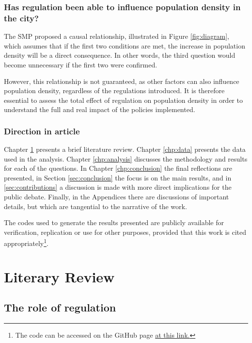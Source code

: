 \subsection*{Has regulation been able to influence population density in the city?}

The SMP proposed a causal relationship, illustrated in Figure \ref{fig:diagram}, which assumes that if the first two conditions are met, the increase in population density will be a direct consequence. In other words, the third question would become unnecessary if the first two were confirmed.

However, this relationship is not guaranteed, as other factors can also influence population density, regardless of the regulations introduced. It is therefore essential to assess the total effect of regulation on population density in order to understand the full and real impact of the policies implemented.

\subsection*{Direction in article}

Chapter \ref{chp:review} presents a brief literature review. Chapter \ref{chp:data} presents the data used in the analysis. Chapter \ref{chp:analysis} discusses the methodology and results for each of the questions. In Chapter \ref{chp:conclusion} the final reflections are presented, in Section \ref{sec:conclusion} the focus is on the main results, and in \ref{sec:contributions} a discussion is made with more direct implications for the public debate. Finally, in the Appendices there are discussions of important details, but which are tangential to the narrative of the work.

The codes used to generate the results presented are publicly available for verification, replication or use for other purposes, provided that this work is cited appropriately\footnote{The code can be accessed on the GitHub page \href{https://github.com/gustavo-tm}{at this link.}}.


\chapter{Literary Review}
\label{chp:review}

\section{The role of regulation}

